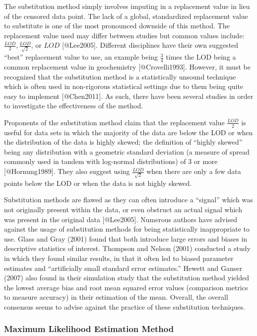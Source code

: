\documentclass[
]{article}
\begin{document}
The substitution method simply involves imputing in a replacement value
in lieu of the censored data point. The lack of a global, standardized
replacement value to substitute is one of the most pronounced downside
of this method. The replacement value used may differ between studies
but common values include: \(\frac{LOD}{2}, \frac{LOD}{\sqrt2}\), or
\(LOD\) {[}@Lee2005{]}. Different disciplines have their own suggested
``best'' replacement value to use, an example being \(\frac{3}{4}\)
times the LOD being a common replacement value in geochemistry
{[}@Crovelli1993{]}. However, it must be recognized that the
substitution method is a statistically unsound technique which is often
used in non-rigorous statistical settings due to them being quite easy
to implement {[}@Chen2011{]}. As such, there have been several studies
in order to investigate the effectiveness of the method.

Proponents of the substitution method claim that the replacement value
\(\frac{LOD}{2}\) is useful for data sets in which the majority of the
data are below the LOD or when the distribution of the data is highly
skewed; the definition of ``highly skewed'' being any distribution with
a geometric standard deviation (a measure of spread commonly used in
tandem with log-normal distributions) of 3 or more {[}@Hornung1989{]}.
They also suggest using \(\frac{LOD}{\sqrt2}\) when there are only a few
data points below the LOD or when the data is not highly skewed.

Substitution methods are flawed as they can often introduce a ``signal''
which was not originally present within the data, or even obstruct an
actual signal which was present in the original data {[}@Lee2005{]}.
Numerous authors have advised against the usage of substitution methods
for being statistically inappropriate to use. Glass and Gray (2001)
found that both introduce large errors and biases in descriptive
statistics of interest. Thompson and Nelson (2001) conducted a study in
which they found similar results, in that it often led to biased
parameter estimates and ``artificially small standard error estimates.''
Hewett and Ganser (2007) also found in their simulation study that the
substitution method yielded the lowest average bias and root mean
squared error values (comparison metrics to measure accuracy) in their
estimation of the mean. Overall, the overall consensus seems to advise
against the practice of these substitution techniques.

\hypertarget{MLE}{%
\subsubsection{Maximum Likelihood Estimation Method}\label{MLE}}
\end{document}
